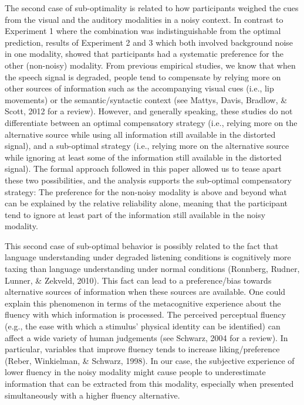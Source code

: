 \documentclass[english,man]{apa6}
\theoremstyle{definition}
\theoremstyle{definition}
\theoremstyle{definition}
\theoremstyle{remark}
\begin{document}
The second case of sub-optimality is related to how participants weighed
the cues from the visual and the auditory modalities in a noisy context.
In contrast to Experiment 1 where the combination was indistinguishable
from the optimal prediction, results of Experiment 2 and 3 which both
involved background noise in one modality, showed that participants had
a systematic preference for the other (non-noisy) modality. From
previous empirical studies, we know that when the speech signal is
degraded, people tend to compensate by relying more on other sources of
information such as the accompanying visual cues (i.e., lip movements)
or the semantic/syntactic context (see Mattys, Davis, Bradlow, \& Scott,
2012 for a review). However, and generally speaking, these studies do
not differentiate between an optimal compensatory strategy (i.e.,
relying more on the alternative source while using all information still
available in the distorted signal), and a sub-optimal strategy (i.e.,
relying more on the alternative source while ignoring at least some of
the information still available in the distorted signal). The formal
approach followed in this paper allowed us to tease apart these two
possibilities, and the analysis supports the sub-optimal compensatory
strategy: The preference for the non-noisy modality is above and beyond
what can be explained by the relative reliability alone, meaning that
the participant tend to ignore at least part of the information still
available in the noisy modality.

This second case of sub-optimal behavior is possibly related to the fact
that language understanding under degraded listening conditions is
cognitively more taxing than language understanding under normal
conditions (Ronnberg, Rudner, Lunner, \& Zekveld, 2010). This fact can
lead to a preference/bias towards alternative sources of information
when these sources are available. One could explain this phenomenon in
terms of the metacognitive experience about the fluency with which
information is processed. The perceived perceptual fluency (e.g., the
ease with which a stimulus' physical identity can be identified) can
affect a wide variety of human judgements (see Schwarz, 2004 for a
review). In particular, variables that improve fluency tends to increase
liking/preference (Reber, Winkielman, \& Schwarz, 1998). In our case,
the subjective experience of lower fluency in the noisy modality might
cause people to underestimate information that can be extracted from
this modality, especially when presented simultaneously with a higher
fluency alternative.
\end{document}
